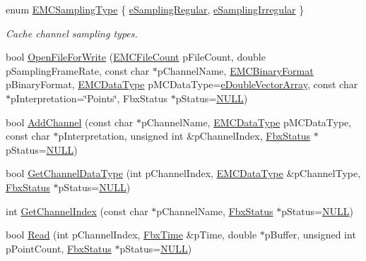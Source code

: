 \begin{DoxyCompactItemize}
\item 
enum \hyperlink{class_fbx_cache_a9d4d8e73c5e2f510b7884ceaee13a173}{E\+M\+C\+Sampling\+Type} \{ \hyperlink{class_fbx_cache_a9d4d8e73c5e2f510b7884ceaee13a173ab7d871fa76cb0e28a77bfa48858637f2}{e\+Sampling\+Regular}, 
\hyperlink{class_fbx_cache_a9d4d8e73c5e2f510b7884ceaee13a173afa23e18952e41deafe9237381018d023}{e\+Sampling\+Irregular}
 \}\begin{DoxyCompactList}\small\item\em Cache channel sampling types. \end{DoxyCompactList}
\item 
bool \hyperlink{class_fbx_cache_a430c418e921a876f442c064b301418be}{Open\+File\+For\+Write} (\hyperlink{class_fbx_cache_afa5d133385fbd74b59e619c692a9cc36}{E\+M\+C\+File\+Count} p\+File\+Count, double p\+Sampling\+Frame\+Rate, const char $\ast$p\+Channel\+Name, \hyperlink{class_fbx_cache_af3afea849dd371f0b5ecbe135d34b829}{E\+M\+C\+Binary\+Format} p\+Binary\+Format, \hyperlink{class_fbx_cache_a80f82fa5f485ff6c46565ffb151998b3}{E\+M\+C\+Data\+Type} p\+M\+C\+Data\+Type=\hyperlink{class_fbx_cache_a80f82fa5f485ff6c46565ffb151998b3a650d3bda5d6886776bee42118f711cb3}{e\+Double\+Vector\+Array}, const char $\ast$p\+Interpretation=\char`\"{}Points\char`\"{}, Fbx\+Status $\ast$p\+Status=\hyperlink{fbxarch_8h_a070d2ce7b6bb7e5c05602aa8c308d0c4}{N\+U\+LL})
\item 
bool \hyperlink{class_fbx_cache_a5cc3311b704a1405aae637cd8a30e1c8}{Add\+Channel} (const char $\ast$p\+Channel\+Name, \hyperlink{class_fbx_cache_a80f82fa5f485ff6c46565ffb151998b3}{E\+M\+C\+Data\+Type} p\+M\+C\+Data\+Type, const char $\ast$p\+Interpretation, unsigned int \&p\+Channel\+Index, \hyperlink{class_fbx_status}{Fbx\+Status} $\ast$p\+Status=\hyperlink{fbxarch_8h_a070d2ce7b6bb7e5c05602aa8c308d0c4}{N\+U\+LL})
\item 
bool \hyperlink{class_fbx_cache_a9d9df7b63fda0e41676187395c325b9b}{Get\+Channel\+Data\+Type} (int p\+Channel\+Index, \hyperlink{class_fbx_cache_a80f82fa5f485ff6c46565ffb151998b3}{E\+M\+C\+Data\+Type} \&p\+Channel\+Type, \hyperlink{class_fbx_status}{Fbx\+Status} $\ast$p\+Status=\hyperlink{fbxarch_8h_a070d2ce7b6bb7e5c05602aa8c308d0c4}{N\+U\+LL})
\item 
int \hyperlink{class_fbx_cache_a1fb8b5cea553cd7e03278700279efc90}{Get\+Channel\+Index} (const char $\ast$p\+Channel\+Name, \hyperlink{class_fbx_status}{Fbx\+Status} $\ast$p\+Status=\hyperlink{fbxarch_8h_a070d2ce7b6bb7e5c05602aa8c308d0c4}{N\+U\+LL})
\item 
bool \hyperlink{class_fbx_cache_ac31fdd1b306da04cebdb51a6b1fd8521}{Read} (int p\+Channel\+Index, \hyperlink{class_fbx_time}{Fbx\+Time} \&p\+Time, double $\ast$p\+Buffer, unsigned int p\+Point\+Count, \hyperlink{class_fbx_status}{Fbx\+Status} $\ast$p\+Status=\hyperlink{fbxarch_8h_a070d2ce7b6bb7e5c05602aa8c308d0c4}{N\+U\+LL})

\end{DoxyCompactItemize}
